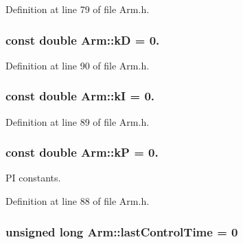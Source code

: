 Definition at line 79 of file Arm.\-h.

\hypertarget{classArm_aba816c407060b76429a785f6b15a6980}{
\subsubsection[{k\-D}]{\setlength{\rightskip}{0pt plus 5cm}const double Arm\-::k\-D = 0.\hspace{0.3cm}{\ttfamily [private]}}}\label{classArm_aba816c407060b76429a785f6b15a6980}


Definition at line 90 of file Arm.\-h.

\hypertarget{classArm_a15dca8014bd3994a0d9b62efc0bcb983}{
\subsubsection[{k\-I}]{\setlength{\rightskip}{0pt plus 5cm}const double Arm\-::k\-I = 0.\hspace{0.3cm}{\ttfamily [private]}}}\label{classArm_a15dca8014bd3994a0d9b62efc0bcb983}


Definition at line 89 of file Arm.\-h.

\hypertarget{classArm_ac6d95b0c5f8a7700b3d25a9fcead2291}{
\subsubsection[{k\-P}]{\setlength{\rightskip}{0pt plus 5cm}const double Arm\-::k\-P = 0.\hspace{0.3cm}{\ttfamily [private]}}}\label{classArm_ac6d95b0c5f8a7700b3d25a9fcead2291}


P\-I constants. 



Definition at line 88 of file Arm.\-h.

\hypertarget{classArm_a99d553dd144c5fd2bf8b4c68a66fea1b}{
\subsubsection[{last\-Control\-Time}]{\setlength{\rightskip}{0pt plus 5cm}unsigned long Arm\-::last\-Control\-Time = 0\hspace{0.3cm}{\ttfamily [private]}}}\label{classArm_a99d553dd144c5fd2bf8b4c68a66fea1b}


